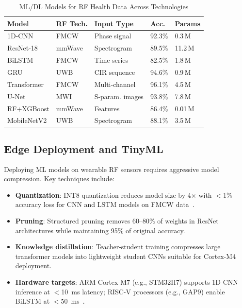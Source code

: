 \documentclass[journal,twoside]{IEEEtran}
\begin{document}
\begin{table}[!t]
\centering
\caption{ML/DL Models for RF Health Data Across Technologies}
\label{tab:ml_comparison}
\renewcommand{\arraystretch}{1.15}
\footnotesize
\begin{tabular}{L{1.1cm}L{1.3cm}L{1.3cm}C{0.8cm}C{1.0cm}}
\toprule
\textbf{Model} & \textbf{RF Tech.} & \textbf{Input Type} & \textbf{Acc.} & \textbf{Params} \\
\midrule
1D-CNN & FMCW & Phase signal & 92.3\% & 0.3\,M \\
ResNet-18 & mmWave & Spectrogram & 89.5\% & 11.2\,M \\
BiLSTM & FMCW & Time series & 82.5\% & 1.8\,M \\
GRU & UWB & CIR sequence & 94.6\% & 0.9\,M \\
Transformer & FMCW & Multi-channel & 96.1\% & 4.5\,M \\
U-Net & MWI & S-param. images & 93.8\% & 7.8\,M \\
RF+XGBoost & mmWave & Features & 86.4\% & 0.01\,M \\
MobileNetV2 & UWB & Spectrogram & 88.1\% & 3.5\,M \\
\bottomrule
\end{tabular}
\end{table}

\subsection{Edge Deployment and TinyML}
Deploying ML models on wearable RF sensors requires aggressive model compression. Key techniques include:
\begin{itemize}
\item \textbf{Quantization}: INT8 quantization reduces model size by 4$\times$ with $<$1\% accuracy loss for CNN and LSTM models on FMCW data~\cite{ref_tinyml2024}.
\item \textbf{Pruning}: Structured pruning removes 60--80\% of weights in ResNet architectures while maintaining 95\% of original accuracy.
\item \textbf{Knowledge distillation}: Teacher-student training compresses large transformer models into lightweight student CNNs suitable for Cortex-M4 deployment.
\item \textbf{Hardware targets}: ARM Cortex-M7 (e.g., STM32H7) supports 1D-CNN inference at $<$10~ms latency; RISC-V processors (e.g., GAP9) enable BiLSTM at $<$50~ms~\cite{ref_biogap2025}.
\end{itemize}
\end{document}

